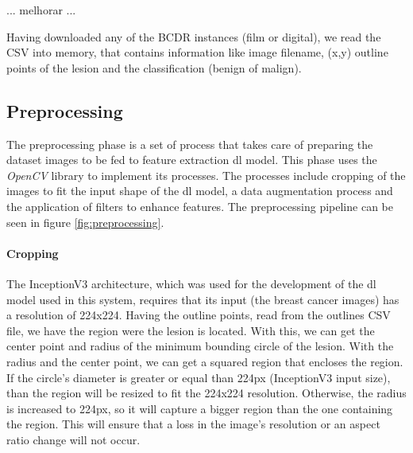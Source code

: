 \documentclass[
  twoside,
  11pt, a4paper,
  footinclude=true,
  headinclude=true,
  cleardoublepage=empty
]{scrbook}
\begin{document}
        ... melhorar ...

        Having downloaded any of the BCDR instances (film or digital), we read the CSV into memory, that contains information like image filename, (x,y) outline points of the lesion and the classification (benign of malign).

      \subsection{Preprocessing}
        The preprocessing phase is a set of process that takes care of preparing the dataset images to be fed to feature extraction \gls{dl} model. This phase uses the \textit{OpenCV} library to implement its processes. The processes include cropping of the images to fit the input shape of the \gls{dl} model, a data augmentation process and the application of filters to enhance features. The preprocessing pipeline can be seen in figure \ref{fig:preprocessing}.


        \paragraph{Cropping}
          The InceptionV3 architecture, which was used for the development of the \gls{dl} model used in this system, requires that its input (the breast cancer images) has a resolution of 224x224. Having the outline points, read from the outlines CSV file, we have the region were the lesion is located. With this, we can get the center point and radius of the minimum bounding circle of the lesion. With the radius and the center point, we can get a squared region that encloses the region. If the circle's diameter is greater or equal than 224px (InceptionV3 input size), than the region will be resized to fit the 224x224 resolution. Otherwise, the radius is increased to 224px, so it will capture a bigger region than the one containing the region. This will ensure that a loss in the image's resolution or an aspect ratio change will not occur.
\end{document}
